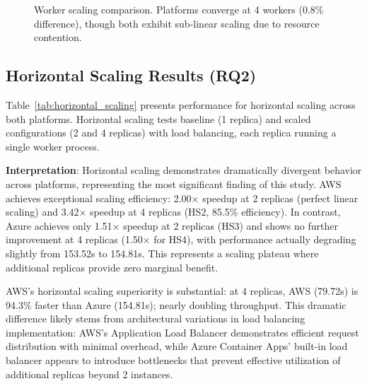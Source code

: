 \begin{figure}[!htbp]
\centering
{}
\caption{Worker scaling comparison. Platforms converge at 4 workers (0.8\% difference), though both exhibit sub-linear scaling due to resource contention.}
\label{fig:workers_4}
\end{figure}

\subsection{Horizontal Scaling Results (RQ2)}

Table~\ref{tab:horizontal_scaling} presents performance for horizontal scaling across both platforms. Horizontal scaling tests baseline (1 replica) and scaled configurations (2 and 4 replicas) with load balancing, each replica running a single worker process.

\textbf{Interpretation}: Horizontal scaling demonstrates dramatically divergent behavior across platforms, representing the most significant finding of this study. AWS achieves exceptional scaling efficiency: 2.00× speedup at 2 replicas (perfect linear scaling) and 3.42× speedup at 4 replicas (HS2, 85.5\% efficiency). In contrast, Azure achieves only 1.51× speedup at 2 replicas (HS3) and shows no further improvement at 4 replicas (1.50× for HS4), with performance actually degrading slightly from 153.52s to 154.81s. This represents a scaling plateau where additional replicas provide zero marginal benefit.

AWS's horizontal scaling superiority is substantial: at 4 replicas, AWS (79.72s) is 94.3\% faster than Azure (154.81s); nearly doubling throughput. This dramatic difference likely stems from architectural variations in load balancing implementation: AWS's Application Load Balancer demonstrates efficient request distribution with minimal overhead, while Azure Container Apps' built-in load balancer appears to introduce bottlenecks that prevent effective utilization of additional replicas beyond 2 instances.

